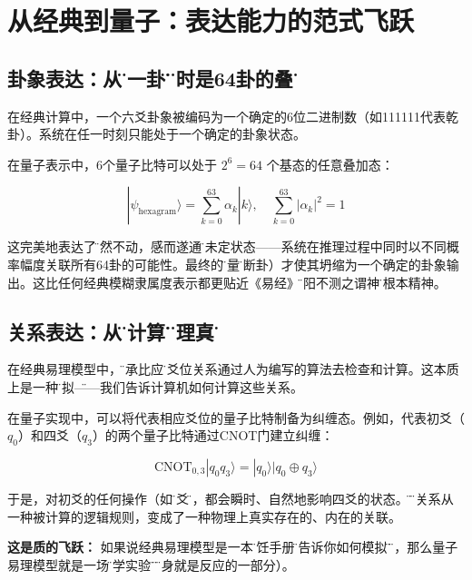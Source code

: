 \documentclass[twocolumn]{article}
\begin{document}
\section{从经典到量子：表达能力的范式飞跃}

\subsection{卦象表达：从\"是一卦\"到\"同时是64卦的叠加\"}

在经典计算中，一个六爻卦象被编码为一个确定的6位二进制数（如111111代表乾卦）。系统在任一时刻只能处于一个确定的卦象状态。

在量子表示中，6个量子比特可以处于 $2^6 = 64$ 个基态的任意叠加态：

\begin{equation}
    |\psi_{\text{hexagram}}\rangle = \sum_{k=0}^{63} \alpha_k |k\rangle, \quad \sum_{k=0}^{63} |\alpha_k|^2 = 1
\end{equation}

这完美地表达了\"寂然不动，感而遂通\"的未定状态——系统在推理过程中同时以不同概率幅度关联所有64卦的可能性。最终的\"测量\"（断卦）才使其坍缩为一个确定的卦象输出。这比任何经典模糊隶属度表示都更贴近《易经》\"阴阳不测之谓神\"的根本精神。

\subsection{关系表达：从\"被计算\"到\"物理真实\"}

在经典易理模型中，\"乘承比应\"等爻位关系通过人为编写的算法去检查和计算。这本质上是一种\"模拟\"——我们告诉计算机如何计算这些关系。

在量子实现中，可以将代表相应爻位的量子比特制备为纠缠态。例如，代表初爻（$q_0$）和四爻（$q_3$）的两个量子比特通过CNOT门建立纠缠：

\begin{equation}
    \text{CNOT}_{0,3} |q_0 q_3\rangle = |q_0\rangle |q_0 \oplus q_3\rangle
\end{equation}

于是，对初爻的任何操作（如\"变爻\"），都会瞬时、自然地影响四爻的状态。\"应\"的关系从一种被计算的逻辑规则，变成了一种物理上真实存在的、内在的关联。

\textbf{这是质的飞跃：} 如果说经典易理模型是一本\"烹饪手册\"（告诉你如何模拟\"应\"），那么量子易理模型就是一场\"化学实验\"（\"应\"本身就是反应的一部分）。
\end{document}
